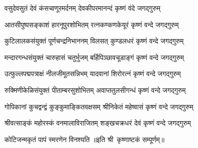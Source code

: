 
\twolineshloka
{वसुदेवसुतं देवं कंसचाणूरमर्दनम्}
{देवकीपरमानन्दं कृष्णं वंदे जगद्गुरुम्}

\twolineshloka
{आतसीपुष्पसङ्काशं हारनूपुरशोभितम्}
{रत्नकण्कणकेयूरं कृष्णं वन्दे जगद्गुरुम्}

\twolineshloka
{कुटिलालकसंयुक्तं पूर्णचन्द्रनिभाननम्}
{विलसत् कुण्डलधरं कृष्णं वन्दे जगद्गुरुम्}

\twolineshloka
{मन्दारगन्धसंयुक्तं चारुहासं चतुर्भुजम्}
{बर्हिपिञ्छावचूडाङ्गं कृष्णं वन्दे जगद्गुरुम्}

\twolineshloka
{उत्फुल्लपद्मपत्राक्षं नीलजीमूतसन्निभम्}
{यादवानां शिरोरत्नं कृष्णं वन्दे जगद्गुरुम्}

\twolineshloka
{रुक्मिणीकेळिसंयुक्तं पीताम्बरसुशोभितम्}
{अवाप्ततुलसीगन्धं कृष्णं वन्दे जगद्गुरुम्}

\twolineshloka
{गोपिकानां कुचद्वन्द्वं कुङ्कुमाङ्कितवक्षसम्}
{श्रीनिकेतं महेष्वासं कृष्णं वन्दे जगद्गुरुम्}

\twolineshloka
{श्रीवत्साङ्कं महोरस्कं वनमालाविराजितम्}
{शङ्खचक्रधरं देवं कृष्णं वन्दे जगद्गुरुम्}

{कोटिजन्मकृतं पापं स्मरणेन विनश्यति}
॥इति श्री~कृष्णाष्टकं सम्पूर्णम्॥